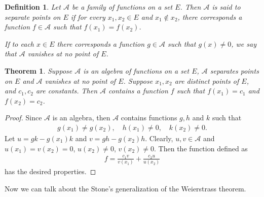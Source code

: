 \documentclass[10pt]{book}
\newtheorem{definition}{Definition}[chapter]
\newtheorem{theorem}{Theorem}[chapter]
\theoremstyle{definition}
\numberwithin{equation}{chapter}
\begin{document}
\medskip

\begin{definition}
Let $\mathscr{A}$ be a family of functions on a set $E$. Then $\mathscr{A}$ is said to separate points on $E$ if for every $x_1, x_2 \in E$ and $x_1 \notin x_2$, there corresponds a function $f \in \mathscr{A}$ such that $f(x_1) = f(x_2)$.

If to each $x \in E$ there corresponds a function $g \in \mathscr{A}$ such that $g(x) \neq 0$, we say that $\mathscr{A}$ vanishes at no point of $E$.
\end{definition}

\medskip

\begin{theorem}\label{th_622}
Suppose $\mathscr{A}$ is an algebra of functions on a set $E$, $\mathscr{A}$ separates points on $E$ and $\mathscr{A}$ vanishes at no point of $E$. Suppose $x_1, x_2$ are distinct points of $E$, and $c_1, c_2$ are constants. Then $\mathscr{A}$ contains a function $f$ such that $f(x_1) = c_1$ and $f(x_2) = c_2$.
\end{theorem}
\begin{proof}
Since $\mathscr{A}$ is an algebra, then $\mathscr{A}$ contains functions $g,h$ and $k$ such that
\begin{align*}
    g(x_1) \neq g(x_2), \quad h(x_1) \neq 0, \quad k(x_2) \neq 0.
\end{align*}
Let $u = gk - g(x_1)k$ and $v = gh - g(x_2)h$. Clearly, $u,v \in \mathscr{A}$ and $u(x_1) = v(x_2) = 0$, $u(x_2) \neq 0$, $v(x_2) \neq 0$. Then the function defined as
\begin{align*}
    f = \frac{c_1v}{v(x_1)} + \frac{c_2u}{u(x_2)}
\end{align*}
has the desired properties.
\end{proof}

\medskip

Now we can talk about the Stone's generalization of the Weierstrass theorem.

\medskip
\end{document}
